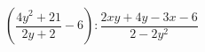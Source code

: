 \begin{ex}[type=expression]
	\begin{condition}
		\(\left( \dfrac{4y^2+21}{2y+2}-6 \right):\dfrac{2xy+4y-3x-6 }{2-2y^2}\)
	\end{condition}
\end{ex}